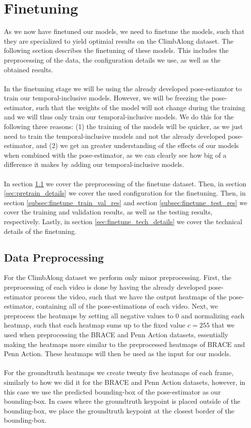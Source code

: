 \documentclass[./main.tex]{subfiles}
\begin{document}
\section{Finetuning}
\label{sec:finetuning}
As we now have finetuned our models, we need to finetune the models, such that they are specialized to yield optimial results on the ClimbAlong dataset. The following section describes the finetuning of these models. This includes the preprocessing of the data, the configuration details we use, as well as the obtained results.
\\
\\
In the finetuning stage we will be using the already developed pose-estiamtor to train our temporal-inclusive models. However, we will be freezing the pose-estimator, such that the weights of the model will not change during the training and we will thus only train our temporal-inclusive models. We do this for the following three reasons: (1) the training of the models will be quicker, as we just need to train the temporal-inclusive models and not the already developed pose-estimator, and (2) we get an greater understanding of the effects of our models when combined with the pose-estimator, as we can clearly see how big of a difference it makes by adding our temporal-inclusive models.
\\
\\
In section \ref{sec:finetune_data_preprocessing} we cover the preprocessing of the finetune dataset. Then, in section \ref{sec:pretrain_details} we cover the used configuration for the finetuning. Then, in section \ref{subsec:finetune_train_val_res} and section \ref{subsec:finetune_test_res} we cover the training and validation results, as well as the testing results, respectively. Lastly, in section \ref{sec:finetune_tech_details} we cover the technical details of the finetuning.

\subsection{Data Preprocessing}
\label{sec:finetune_data_preprocessing}
For the ClimbAlong dataset we perform only minor preprocessing. First, the preprocessing of each video is done by having the already developed pose-estimator process the video, such that we have the output heatmaps of the pose-estimator, containing all of the pose-estimations of each video. Next, we preprocess the heatmaps by setting all negative values to $0$ and normalizing each heatmap, such that each heatmap sums up to the fixed value $c = 255$ that we used when preprocessing the BRACE and Penn Action datasets, essentially making the heatmaps more similar to the preprocessed heatmaps of BRACE and Penn Action. These heatmaps will then be used as the input for our models.
\\
\\
For the groundtruth heatmaps we create twenty five heatmaps of each frame, similarly to how we did it for the BRACE and Penn Action datasets, however, in this case we use the predicted bounding-box of the pose-estimator as our bounding-box. In cases where the groundtruth keypoint is placed outside of the bounding-box, we place the groundtruth keypoint at the closest border of the bounding-box.
\end{document}
